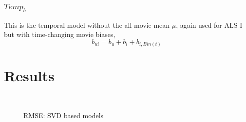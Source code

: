 \subsubsection{$Temp_b$}
This is the temporal model without the all movie mean $\mu$, again used for
ALS-I but with time-changing movie biases,
\begin{equation}
 b_{ui}=b_u+b_i+b_{i,Bin(t)}
\end{equation}

\section{Results}
\begin{figure}[h!]
\centering
{}
\\
\label{fig:RMSE SVD}
\caption{RMSE: SVD based models}
\end{figure}

